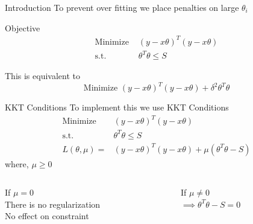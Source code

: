 \documentclass{beamer}
\begin{document}
\begin{frame}{Introduction}
\vspace{0.4cm}
To prevent over fitting we place penalties on large $\theta_i$
 \\ \bigskip
\begin{tcolorbox}{Objective}
\begin{align*}
\text{Minimize } & \left(y-x\theta\right)^T\left(y-x\theta\right) \\
\text{s.t. } & \theta ^T\theta \leq S
\end{align*}
\end{tcolorbox}
\pause
This is equivalent to \vspace{-0.4cm}
$$
\text{Minimize } \left(y-x\theta\right)^T\left(y-x\theta\right) + \delta ^2\theta ^T\theta
$$
\end{frame}  

\begin{frame}{KKT Conditions}
To implement this we use KKT Conditions
\pause
\begin{align*}
\text{Minimize } & \left(y-x\theta\right)^T\left(y-x\theta\right) \\
\text{s.t. } & \theta ^T\theta \leq S \\
L\left(\theta, \mu \right) =& \left(y-x\theta\right)^T\left(y-x\theta\right) + \mu\left(\theta^T\theta - S\right)
\end{align*}
where, $\mu \geq 0$ \bigskip

\pause
\begin{columns}
\begin{column}{0.4\textwidth}
If $\mu = 0$ \\
There is no regularization \\
No effect on constraint
\end{column}
\pause
\begin{column}{0.4\textwidth}
If $\mu\neq 0$ \\
$\implies \theta^T\theta - S = 0$ 
\end{column}
\end{columns}
\end{frame}
\end{document}
